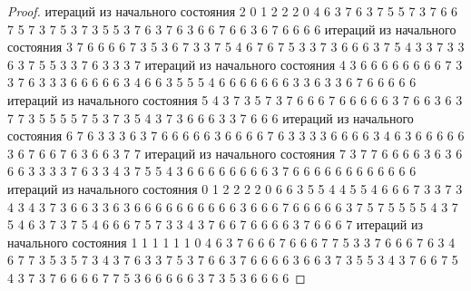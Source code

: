 \begin{proof}
	\newline
	 итераций из начального состояния 2
	 0 1 2 2 2 0 4 6 3 7 6 3 7 5 5 7 3 7 6 6 7 5 7 3 7 5 3 7 3 5 5 3 7 6 3 7 6 3 6 6 7 6 6 3 6 7 6 6 6 6 
	\newline
	 итераций из начального состояния 3
	 7 6 6 6 6 7 3 5 3 6 7 3 3 7 5 4 6 7 6 7 5 3 3 7 3 6 6 6 3 7 5 4 3 3 7 3 3 6 3 7 5 5 3 3 7 6 3 3 3 7 
	\newline
	 итераций из начального состояния 4
	 3 6 6 6 6 6 6 6 6 7 3 3 7 6 3 3 3 6 6 6 6 6 3 4 6 6 3 5 5 5 4 6 6 6 6 6 6 6 3 3 6 3 3 6 7 6 6 6 6 6 
	\newline
	 итераций из начального состояния 5
	 4 3 7 3 5 7 3 7 6 6 6 7 6 6 6 6 6 3 7 6 6 3 6 3 7 7 3 5 5 5 5 7 5 3 7 3 5 4 3 7 3 6 6 6 3 3 7 6 6 6 
	\newline
	 итераций из начального состояния 6
	 7 6 3 3 3 6 3 7 6 6 6 6 6 3 6 6 6 6 7 6 3 3 3 3 6 6 6 6 3 4 6 3 6 6 6 6 6 3 6 7 6 6 7 6 3 6 6 3 7 7 
	\newline
	 итераций из начального состояния 7
	 3 7 7 6 6 6 6 3 6 3 6 6 6 3 3 3 3 7 6 3 3 4 3 7 5 5 4 3 6 6 6 6 6 6 6 6 3 7 6 6 6 6 6 6 6 6 6 6 6 6 
	\newline
	 итераций из начального состояния 0
	 1 2 2 2 2 0 6 6 3 5 5 4 4 5 5 4 6 6 6 7 3 3 7 3 4 3 4 3 7 3 6 6 3 3 6 3 6 6 6 6 6 6 6 6 6 6 3 6 6 6 7 6 6 6 6 6 3 7 5 7 5 5 5 5 4 3 7 5 4 6 3 7 3 7 5 4 6 6 6 7 5 7 3 3 4 3 7 6 6 7 6 6 6 6 3 7 6 6 6 7 
	\newline
	 итераций из начального состояния 1
	 1 1 1 1 1 0 4 6 3 7 6 6 6 7 6 6 6 7 7 5 3 3 7 6 6 6 7 6 3 4 6 7 7 3 5 3 5 7 3 4 3 7 6 3 3 7 5 3 7 6 6 3 7 6 6 6 6 3 6 6 3 7 3 5 5 3 4 3 7 6 6 7 5 4 3 7 3 7 6 6 6 6 7 7 5 3 6 6 6 6 6 3 7 3 5 3 6 6 6 6 
	\newline
	\newline

\end{proof}
